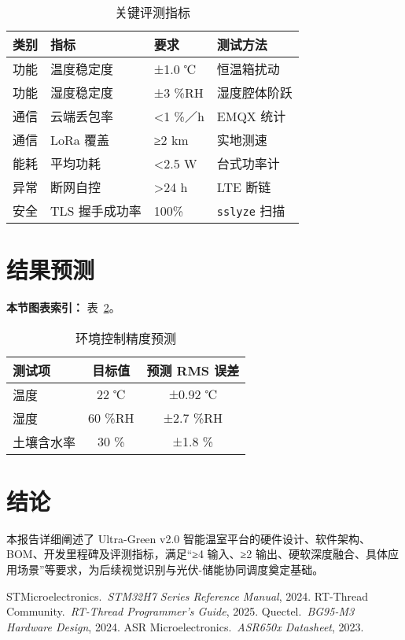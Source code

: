\documentclass[UTF8,a4paper]{ctexart}
\newcommand{\tabfont}{\zihao{-5}}
\begin{document}
\begin{table}[htbp]
    \centering
    \caption{关键评测指标}
    \label{tab:evaluate}
    \tabfont
    \begin{tabular}{@{}llll@{}}
        \toprule
        类别 & 指标 & 要求 & 测试方法 \\ \midrule
        功能 & 温度稳定度 & ±1.0 ℃ & 恒温箱扰动 \\
        功能 & 湿度稳定度 & ±3 \%RH & 湿度腔体阶跃 \\
        通信 & 云端丢包率 & <1 \%／h & EMQX 统计 \\
        通信 & LoRa 覆盖 & ≥2 km & 实地测速 \\
        能耗 & 平均功耗 & <2.5 W & 台式功率计 \\
        异常 & 断网自控 & >24 h & LTE 断链 \\
        安全 & TLS 握手成功率 & 100\% & \texttt{sslyze} 扫描 \\ \bottomrule
    \end{tabular}
\end{table}

\section{结果预测}
\textbf{本节图表索引：} 表~\ref{tab:result}。

\begin{table}[htbp]
    \centering
    \caption{环境控制精度预测}
    \label{tab:result}
    \tabfont
    \begin{tabular}{@{}lcc@{}}
        \toprule
        测试项 & 目标值 & 预测 RMS 误差 \\ \midrule
        温度 & 22 ℃ & ±0.92 ℃ \\
        湿度 & 60 \%RH & ±2.7 \%RH \\
        土壤含水率 & 30 \% & ±1.8 \% \\ \bottomrule
    \end{tabular}
\end{table}

\section{结论}
本报告详细阐述了 Ultra-Green v2.0 智能温室平台的硬件设计、软件架构、BOM、开发里程碑及评测指标，满足“≥4 输入、≥2 输出、硬软深度融合、具体应用场景”等要求，为后续视觉识别与光伏-储能协同调度奠定基础。

\begin{thebibliography}{9}
 STMicroelectronics.\ \emph{STM32H7 Series Reference Manual}, 2024.
 RT-Thread Community.\ \emph{RT-Thread Programmer’s Guide}, 2025.
 Quectel.\ \emph{BG95-M3 Hardware Design}, 2024.
 ASR Microelectronics.\ \emph{ASR650x Datasheet}, 2023.
\end{thebibliography}
\end{document}
